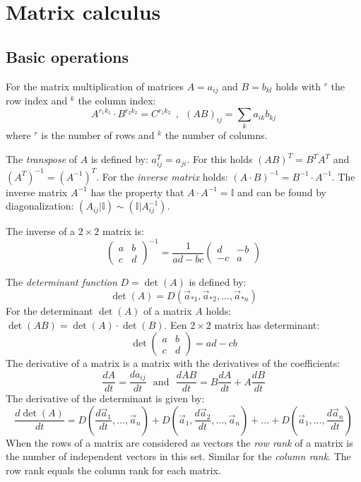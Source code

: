 \section{Matrix calculus}
\subsection{Basic operations}
For the matrix multiplication of matrices $A=a_{ij}$ and $B=b_{kl}$ holds
with $^r$ the row index and $^k$ the column index:
\[
A^{r_1k_1}\cdot B^{r_2k_2}=C^{r_1k_2}~~,~~(AB)_{ij}=\sum_ka_{ik}b_{kj}
\]
where $^r$ is the number of rows and $^k$ the number of columns.

The {\it transpose} of $A$ is defined by: $a_{ij}^T=a_{ji}$.
For this holds $(AB)^T=B^TA^T$ and $(A^T)^{-1}=(A^{-1})^T$. For the
{\it inverse matrix} holds: $(A\cdot B)^{-1}=B^{-1}\cdot A^{-1}$. The inverse
matrix $A^{-1}$ has the property that $A\cdot A^{-1}= \mathbb{I}$ and can be found by
diagonalization: $(A_{ij}| \mathbb{I})\sim( \mathbb{I}|A_{ij}^{-1})$.

The inverse of a $2\times2$ matrix is:
\[
\left(\begin{array}{cc}a&b\\ c&d\end{array}\right)^{-1}=\frac{1}{ad-bc}
\left(\begin{array}{cc}d&-b\\ -c&a\end{array}\right)
\]

The {\it determinant function} $D=\det(A)$ is defined by:
\[
\det(A)=D(\vec{a}_{*1},\vec{a}_{*2},...,\vec{a}_{*n})
\]
For the determinant $\det(A)$ of a matrix $A$ holds:
$\det(AB)=\det(A)\cdot\det(B)$. Een $2\times2$ matrix has determinant:
\[
\det\left(\begin{array}{cc}a&b\\ c&d \end{array}\right)=ad-cb
\]
The derivative of a matrix is a matrix with the derivatives of the coefficients:
\[
\frac{dA}{dt}=\frac{da_{ij}}{dt}~~~\mbox{and}~~~\frac{dAB}{dt}=B\frac{dA}{dt}+A\frac{dB}{dt}
\]
The derivative of the determinant is given by:
\[
\frac{d\det(A)}{dt}=D(\frac{d\vec{a}_1}{dt},...,\vec{a}_n)+
D(\vec{a}_1,\frac{d\vec{a}_2}{dt},...,\vec{a}_n)+...+D(\vec{a}_1,...,\frac{d\vec{a}_n}{dt})
\]
When the rows of a matrix are considered as vectors the {\it row rank} of a
matrix is the number of independent vectors in this set. Similar for the
{\it column rank}. The row rank equals the column rank for each matrix.

